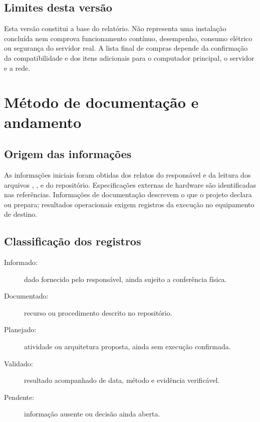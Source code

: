 \documentclass[11pt,a4paper,oneside]{report}
\begin{document}
\section{Limites desta versão}
Esta versão constitui a base do relatório. Não representa uma instalação
concluída nem comprova funcionamento contínuo, desempenho, consumo elétrico ou
segurança do servidor real. A lista final de compras depende da confirmação
da compatibilidade e dos itens adicionais para o computador principal,
o servidor e a rede.

\chapter{Método de documentação e andamento}
\section{Origem das informações}
As informações iniciais foram obtidas dos relatos do responsável e da leitura
dos arquivos , ,
 e  do repositório.
Especificações externas de hardware são identificadas nas referências.
Informações de documentação descrevem o que o projeto declara ou prepara;
resultados operacionais exigem registros da execução no equipamento de destino.

\section{Classificação dos registros}
\begin{description}
\item[Informado:] dado fornecido pelo responsável, ainda sujeito a conferência física.
\item[Documentado:] recurso ou procedimento descrito no repositório.
\item[Planejado:] atividade ou arquitetura proposta, ainda sem execução confirmada.
\item[Validado:] resultado acompanhado de data, método e evidência verificável.
\item[Pendente:] informação ausente ou decisão ainda aberta.
\end{description}
\end{document}
